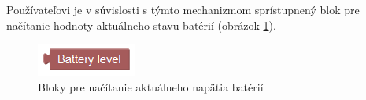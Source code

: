 Používateľovi je v súvislosti s týmto mechanizmom sprístupnený blok pre načítanie hodnoty aktuálneho stavu batérií (obrázok \ref{obr:battery-block}).

\begin{figure}[h]
\centerline{\includegraphics[]{images/battery-block}}
\caption[Bloky pre načítanie aktuálneho napätia batérií]{Bloky pre načítanie aktuálneho napätia batérií}
\label{obr:battery-block}
\end{figure}
  











